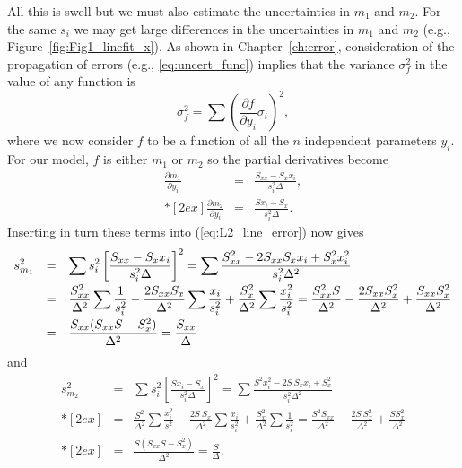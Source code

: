    All this is swell but we must also estimate the uncertainties in $m_1$ and $m_2$.  For the same $s_i$ we 
may get large differences in the uncertainties in $m_1$ and $m_2$ (e.g., Figure~\ref{fig:Fig1_linefit_x}).
As shown in Chapter~\ref{ch:error}, consideration of the propagation of errors (e.g., \ref{eq:uncert_func}) implies
that the variance $\sigma_f^2$ in the value of any function is
\begin{equation}
\sigma^2_f = \sum \left ( \frac{\partial f}{\partial y_i} \sigma_i \right )^2,
\label{eq:L2_line_error}
\end{equation}
where we now consider $f$ to be a function of all the $n$ independent parameters $y_i$. For our model,
$f$ is either $m_1$ or $m_2$ so the partial derivatives become
\begin{equation}
\begin{array}{rcl}
\displaystyle \frac{\partial m_1}{\partial y_i} & = & \displaystyle \frac{S_{xx} - S_x x_i}{s ^2_i \Delta},\\*[2ex]
\displaystyle \frac{\partial m_2}{\partial y_i} & = & \displaystyle \frac{Sx_{i} - S_x}{s ^2_i \Delta}.
\end{array}
\end{equation}
Inserting in turn these terms into (\ref{eq:L2_line_error}) now gives
\begin{equation}
\begin{array}{rcl} 
\displaystyle
\displaystyle s^2_{m_1} & = & \displaystyle \sum s^2_i \left [ \frac{S_{xx} - S_{x} x_i}{s ^2_i \Delta} \right ] ^2 = \sum \frac{S^2_{xx} - 2S_{xx}S_{x}x_i + S^2_x x^2_i}{s^2_i \Delta ^2}\\*[2ex]
& = & \displaystyle \frac{S^2_{xx}}{\Delta^2} \sum \frac{1}{s^2_i} - \frac{2S_{xx}S_x}{\Delta^2}
\sum \frac{x_i}{s^2_i} + \frac{S^2_x}{\Delta^2} \sum \frac{x^2_i}{s^2_i}= \frac{S^2_{xx}S}{\Delta^2} - \frac{2S_{xx}S^2_x}{\Delta ^2} + \frac{S_{xx}S^2_x}{\Delta^2} \\*[2ex]
& = & \displaystyle \frac{S_{xx} (S_{xx}S-S^2_x)}{\Delta^2} = \frac{S_{xx}}{\Delta}
\end{array}
\end{equation}
and	
\begin{equation}
\begin{array}{rcl}
\displaystyle s^2_{m_2} & = & \displaystyle \sum s^2_i \left [ \frac{Sx_i - S_x}{s^2_i \Delta} \right ] ^2 =
\sum \frac{S^2x^2_i - 2S \ S_x x_i + S^2_x}{s^2_i \Delta^2}\\*[2ex]
 &  = & \displaystyle \frac{S^2}{\Delta^2}\sum \frac{x^2_i}{s^2_i} - 
\frac{2S \ S_x}{\Delta^2} \sum \frac{x_i}{s^2_i} + \frac{S^2_x}{\Delta^2} \sum \frac{1}{s^2_i} = \frac{S^2S_{xx}}{\Delta^2} - \frac{2S \ S^2_x}{\Delta^2} + \frac{S S^2_x}{\Delta ^2}\\*[2ex]
& = & \displaystyle \frac{S(S_{xx}S - S^2_x)}{\Delta^2} = \frac{S}{\Delta}.
\label{eq:err_in_slope}
\end{array}
\end{equation}
